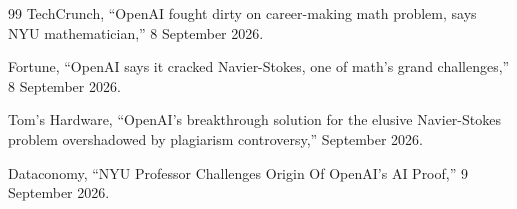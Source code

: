 \documentclass[11pt]{article}
\begin{document}
\begin{thebibliography}{99}
TechCrunch, ``OpenAI fought dirty on career-making math problem, says NYU mathematician,'' 8 September 2026.

Fortune, ``OpenAI says it cracked Navier-Stokes, one of math's grand challenges,'' 8 September 2026.

Tom's Hardware, ``OpenAI's breakthrough solution for the elusive Navier-Stokes problem overshadowed by plagiarism controversy,'' September 2026.

Dataconomy, ``NYU Professor Challenges Origin Of OpenAI's AI Proof,'' 9 September 2026.

\end{thebibliography}
\end{document}
